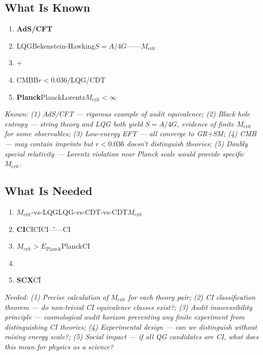 \documentclass[12pt,a4paper]{article}
\theoremstyle{remark}
\begin{document}
\subsection{ What Is Known}

\begin{enumerate}[label=(\arabic*)]
    \item \textbf{AdS/CFT}
    
    \item \textbf{}LQGBekenstein-Hawking$S = A/4G$——$M_{\text{crit}}$
    
    \item \textbf{}+
    
    \item \textbf{}CMBB$r < 0.036$/LQG/CDT
    
    \item \textbf{Planck}PlanckLorentz$M_{\text{crit}} < \infty$
\end{enumerate}

\medskip
\noindent\textit{Known: (1) AdS/CFT — rigorous example of audit equivalence; (2) Black hole entropy — string theory and LQG both yield $S = A/4G$, evidence of finite $M_{\text{crit}}$ for some observables; (3) Low-energy EFT — all converge to GR+SM; (4) CMB — may contain imprints but $r < 0.036$ doesn't distinguish theories; (5) Doubly special relativity — Lorentz violation near Planck scale would provide specific $M_{\text{crit}}$.}

\subsection{ What Is Needed}

\begin{enumerate}[label=(\arabic*)]
    \item \textbf{$M_{\text{crit}}$}-vs-LQGLQG-vs-CDT-vs-CDT$M_{\text{crit}}$\textbf{}
    
    \item \textbf{CI}CICICI\"\"——CI
    
    \item \textbf{}$M_{\text{crit}} > E_{\text{Planck}}$Planck\textbf{}CI
    
    \item \textbf{}\textit{}
    
    \item \textbf{SCX}CI\"\"
\end{enumerate}

\medskip
\noindent\textit{Needed: (1) Precise calculation of $M_{\text{crit}}$ for each theory pair; (2) CI classification theorem — do non-trivial CI equivalence classes exist?; (3) Audit inaccessibility principle — cosmological audit horizon preventing any finite experiment from distinguishing CI theories; (4) Experimental design — can we distinguish without raising energy scale?; (5) Social impact — if all QG candidates are CI, what does this mean for physics as a science?}
\end{document}
